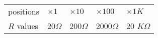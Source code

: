 \begin{enumerate}
\begin{itemize}
      \begin{tabular}{l|llll} \hline
	positions  & $\times 1$ & $\times 10$ & $\times 100$ & $\times 1K$ \\
	$R$ values & 20$\Omega$ & 200$\Omega$ & 2000$\Omega$ & 20 $K\Omega$ 
      \end{tabular}


%
     
  \end{itemize}

\end{enumerate}


